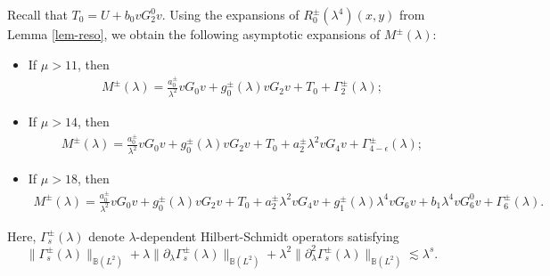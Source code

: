 \documentclass[reqno]{amsart}
\numberwithin{equation}{section}
\begin{document}
Recall that  $T_0=U+b_0 v G_2^0 v$.
Using the expansions of $R^\pm_0(\lambda^4)(x,y)$ from Lemma \ref{lem-reso}, we obtain the following asymptotic expansions of $M^\pm(\lambda)$:
\begin{itemize}
\item If $\mu > 11$, then
\begin{equation}\label{Mpm-1}
\begin{split}
M^\pm(\lambda) = \frac{a_0^\pm}{\lambda^2}v G_{0} v + g_0^\pm(\lambda)v G_{2} v + T_0 + \Gamma_2^\pm (\lambda);
\end{split}
\end{equation}

\item If $\mu > 14$, then
\begin{equation}\label{Mpm-2}
\begin{split}
M^\pm(\lambda) = \frac{a_0^\pm}{\lambda^2}v G_{0} v + g_0^\pm(\lambda)v G_{2} v + T_0 + a_2^\pm\lambda^2 vG_4 v + \Gamma_{4-\epsilon}^\pm (\lambda);
\end{split}
\end{equation}

\item
If $\mu > 18$, then
\begin{equation}\label{Mpm-3}
\begin{split}
M^\pm(\lambda) = \frac{a_0^\pm}{\lambda^2}v G_{0} v + g_0^\pm(\lambda)v G_{2} v + T_0 + a_2^\pm\lambda^2 vG_4 v + g_1^\pm(\lambda)\lambda^4vG_6v + b_1\lambda^4 vG_6^0v  + \Gamma_6^\pm (\lambda).
\end{split}
\end{equation}
\end{itemize}
Here, $\Gamma_s^\pm (\lambda)$ denote $\lambda$-dependent Hilbert-Schmidt operators satisfying
\[
\big\| \Gamma_s^\pm (\lambda) \big\|_{\mathbb{B}(L^2)} +\lambda \big\| \partial_\lambda \Gamma_s^\pm (\lambda) \big\|_{\mathbb{B}(L^2)}+\lambda^2 \big\| \partial_\lambda^2 \Gamma_s^\pm (\lambda) \big\|_{\mathbb{B}(L^2)}
\lesssim \lambda^{s}.
\]
\end{document}
